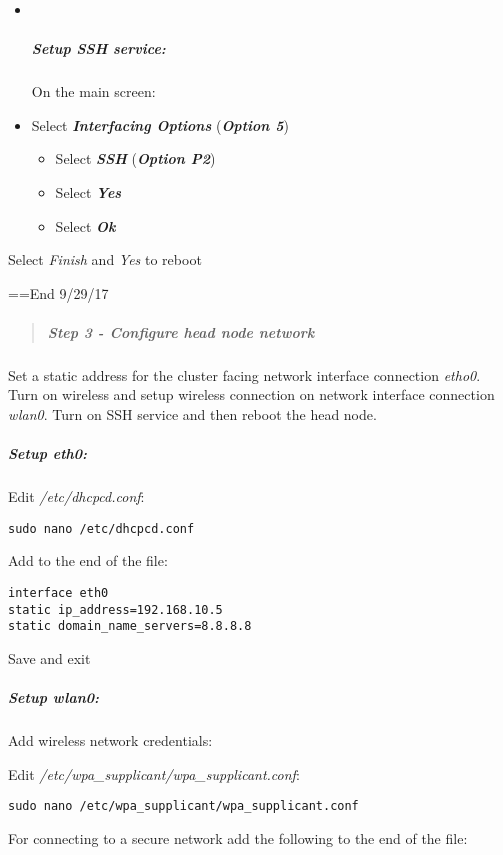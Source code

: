 \documentclass[]{article}
\providecommand{\tightlist}{%
  \setlength{\itemsep}{0pt}\setlength{\parskip}{0pt}}
\let\oldsubparagraph\subparagraph
\renewcommand{\subparagraph}[1]{\oldsubparagraph{#1}\mbox{}}
\begin{document}
\begin{itemize}
\item ~
  \subparagraph{Setup SSH service:}\label{setup-ssh-service}

  On the main screen:
\item
  Select \emph{\textbf{Interfacing Options}} (\emph{\textbf{Option 5}})

  \begin{itemize}
  \tightlist
  \item
    Select \emph{\textbf{SSH}} (\emph{\textbf{Option P2}})
  \item
    Select \emph{\textbf{Yes}}
  \item
    Select \emph{\textbf{Ok}}
  \end{itemize}
\end{itemize}

Select \emph{Finish} and \emph{Yes} to reboot

==End 9/29/17

\begin{quote}
\mbox{}%
\subparagraph{Step 3 - Configure head node
network}\label{step-3---configure-head-node-network}
\end{quote}

Set a static address for the cluster facing network interface connection
\emph{etho0}. Turn on wireless and setup wireless connection on network
interface connection \emph{wlan0}. Turn on SSH service and then reboot
the head node.

\subparagraph{\texorpdfstring{Setup
\emph{eth0}:}{Setup eth0:}}\label{setup-eth0}

Edit \emph{/etc/dhcpcd.conf}:

\texttt{sudo\ nano\ /etc/dhcpcd.conf}

Add to the end of the file:

\begin{verbatim}
interface eth0
static ip_address=192.168.10.5
static domain_name_servers=8.8.8.8
\end{verbatim}

Save and exit

\subparagraph{\texorpdfstring{Setup
\emph{wlan0}:}{Setup wlan0:}}\label{setup-wlan0}

Add wireless network credentials:

Edit \emph{/etc/wpa\_supplicant/wpa\_supplicant.conf}:

\texttt{sudo\ nano\ /etc/wpa\_supplicant/wpa\_supplicant.conf}

For connecting to a secure network add the following to the end of the
file:
\end{document}
